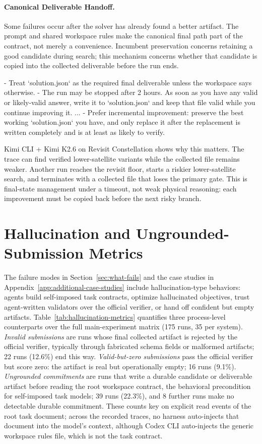 \documentclass[]{mosi}
\newenvironment{promptblock}
  {\VerbatimEnvironment\par\smallskip\Needspace{10\baselineskip}\noindent\begin{promptblockinner}}
  {\end{promptblockinner}\par\smallskip}
\begin{document}
\paragraph{Canonical Deliverable Handoff.} Some failures occur after the solver has already found a better artifact. The prompt and shared workspace rules make the canonical final path part of the contract, not merely a convenience. Incumbent preservation concerns retaining a good candidate during search; this mechanism concerns whether that candidate is copied into the collected deliverable before the run ends.
\begin{promptblock}
- Treat `solution.json` as the required final deliverable unless the workspace
  says otherwise.
- The run may be stopped after 2 hours. As soon as you have any valid or
  likely-valid answer, write it to `solution.json` and keep that file valid
  while you continue improving it.
...
- Prefer incremental improvement: preserve the best working `solution.json`
  you have, and only replace it after the replacement is written completely
  and is at least as likely to verify.
\end{promptblock}
Kimi CLI + Kimi K2.6 on Revisit Constellation shows why this matters. The trace can find verified lower-satellite variants while the collected file remains weaker. Another run reaches the revisit floor, starts a riskier lower-satellite search, and terminates with a collected file that loses the primary gate. This is final-state management under a timeout, not weak physical reasoning: each improvement must be copied back before the next risky branch.

\section{Hallucination and Ungrounded-Submission Metrics}
\label{app:hallucination-metrics}

The failure modes in Section~\ref{sec:what-fails} and the case studies in Appendix~\ref{app:additional-case-studies} include hallucination-type behaviors: agents build self-imposed task contracts, optimize hallucinated objectives, trust agent-written validators over the official verifier, or hand off confident but empty artifacts. Table~\ref{tab:hallucination-metrics} quantifies three process-level counterparts over the full main-experiment matrix (175 runs, 35 per system). \emph{Invalid submissions} are runs whose final collected artifact is rejected by the official verifier, typically through fabricated schema fields or malformed artifacts; 22 runs (12.6\%) end this way. \emph{Valid-but-zero submissions} pass the official verifier but score zero: the artifact is real but operationally empty; 16 runs (9.1\%). \emph{Ungrounded commitments} are runs that write a durable candidate or deliverable artifact before reading the root workspace contract, the behavioral precondition for self-imposed task models; 39 runs (22.3\%), and 8 further runs make no detectable durable commitment. These counts key on explicit read events of the root task document; across the recorded traces, no harness auto-injects that document into the model's context, although Codex CLI auto-injects the generic workspace rules file, which is not the task contract.
\end{document}
